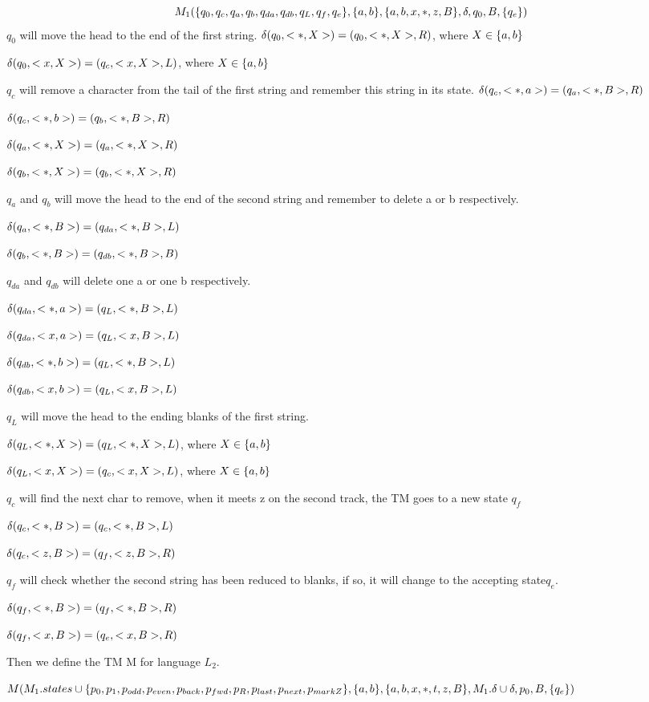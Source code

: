 \documentclass[a4paper,UTF8]{ctexart}
\theoremstyle{definition}
\begin{document}
\[M_1(
  \{ q_0,q_c,q_a,q_b,q_{da},q_{db},q_L,q_f,q_e \},
  \{ a,b \},
  \{ a,b,x,*,z,B \},
  \delta,
  q_0,
  B,
  \{ q_e \}
)\]
$q_0$ will move the head to the end of the first string.
$\delta(q_0,<*,X>)=(q_0,<*,X>,R)$, where $X \in \{ a,b \}$

$\delta(q_0,<x,X>)=(q_c,<x,X>,L)$, where $X \in \{ a,b \}$

$q_c$ will remove a character from the tail of the first
string and remember this string in its state.
$\delta(q_c,<*,a>)=(q_a,<*,B>,R)$

$\delta(q_c,<*,b>)=(q_b,<*,B>,R)$

$\delta(q_a,<*,X>)=(q_a,<*,X>,R)$

$\delta(q_b,<*,X>)=(q_b,<*,X>,R)$

$q_a$ and $q_b$ will move the head to the end of the second 
string and remember to delete a or b respectively.

$\delta(q_a,<*,B>)=(q_{da},<*,B>,L)$

$\delta(q_b,<*,B>)=(q_{db},<*,B>,B)$

$q_{da}$ and $q_{db}$ will delete one a or one b respectively.

$\delta(q_{da},<*,a>)=(q_L,<*,B>,L)$

$\delta(q_{da},<x,a>)=(q_L,<x,B>,L)$

$\delta(q_{db},<*,b>)=(q_L,<*,B>,L)$

$\delta(q_{db},<x,b>)=(q_L,<x,B>,L)$

$q_L$ will move the head to the ending blanks of the 
first string.

$\delta(q_L,<*,X>)=(q_L,<*,X>,L)$, where $X \in \{ a,b \}$

$\delta(q_L,<x,X>)=(q_c,<x,X>,L)$, where $X \in \{ a,b \}$

$q_c$ will find the next char to remove,
when it meets z on the second track, the TM goes
to a new state $q_f$

$\delta(q_c,<*,B>)=(q_c,<*,B>,L)$

$\delta(q_c,<z,B>)=(q_f,<z,B>,R)$

$q_f$ will check whether the second string 
has been reduced to blanks, if so, it will 
change to the accepting state$q_e$.

$\delta(q_f,<*,B>)=(q_f,<*,B>,R)$

$\delta(q_f,<x,B>)=(q_e,<x,B>,R)$

Then we define the TM M for language $L_2$.

$M(
  M_1.states \cup \{ p_0,p_1,p_{odd},p_{even},p_{back},p_{fwd},p_R,p_{last},p_{next},p_{markZ} \},
  \{ a,b \}, 
  \{ a,b,x,*,t,z,B \},\\
  M_1.\delta \cup \delta,
  p_0,
  B,
  \{ q_e \}
)$
\end{document}
